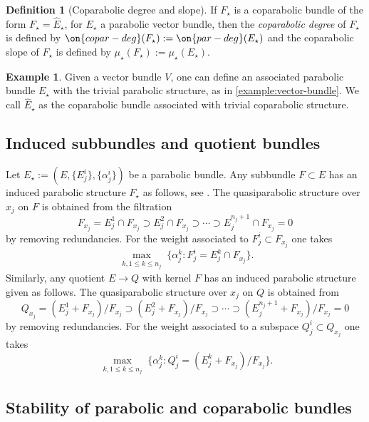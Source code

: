 \documentclass[12 pt]{amsart}
\theoremstyle{plain}
\theoremstyle{definition}
\newtheorem{definition}[subsubsection]{Definition}
\newtheorem{example}[subsubsection]{Example}
\theoremstyle{remark}
\numberwithin{equation}{section}
\begin{document}
\begin{definition}[Coparabolic degree and slope]
	\label{definition:}
	If $F_\star$ is a coparabolic bundle of the form $F_\star = \widehat{E}_\star$,
for $E_\star$ a parabolic vector bundle, then the {\em coparabolic degree} of
$F_\star$ is defined by $\on{copar-deg}(F_\star) := \on{par-deg}(E_\star)$ and the
coparabolic slope of $F_\star$ is defined by $\mu_\star(F_\star) := \mu_\star(E_\star)$.
\end{definition}
\begin{example}
	\label{example:vector-bundle-co}
	Given a vector bundle $V$, one can define an associated parabolic bundle
	$E_\star$ with the trivial parabolic structure, as in
	\autoref{example:vector-bundle}. We call $\widehat{E}_\star$
	as the coparabolic bundle associated with trivial coparabolic structure.
\end{example}



\subsection{Induced subbundles and quotient bundles}

\label{subsubsection:induced-subbundle}
Let $E_\star := (E, \{E^i_j\}, \{\alpha^i_j\})$ be a parabolic bundle.
	Any subbundle $F \subset E$ has an induced parabolic structure $F_\star$ as
	follows, see
\cite[Part 3, \S1.A, Definition 4]{seshadri:fibres-vectoriels-sur-les-courbes-algebriques}.
	The quasiparabolic structure over $x_j$ on $F$ is obtained
	from the filtration $$F_{x_j} = E^1_j \cap F_{x_j} \supset E^2_j \cap
	F_{x_j} \supset \cdots \supset E^{n_j+1}_j \cap F_{x_j} = 0$$
	by removing redundancies. For the weight associated to $F^i_j \subset
	F_{x_j}$ one takes $$\max_{\substack{k, 1 \leq k \leq n_j}} \{ \alpha^k_j : F^i_j = E^k_j \cap
	F_{x_j}\}.$$
	Similarly, any quotient $E \to Q$ with kernel $F$ has an induced parabolic structure
	given as follows.
	The quasiparabolic structure over $x_j$ on $Q$ is obtained from
	$$Q_{x_j} = (E^1_j+F_{x_j})/F_{x_j} \supset (E^2_j+F_{x_j})/F_{x_j}\supset\cdots\supset 
	(E^{n_j+1}_j+F_{x_j})/F_{x_j} = 0$$
	by removing redundancies. For the weight associated to a subspace $Q^i_j \subset
Q_{x_j}$ one takes $$\max_{\substack{k, 1 \leq k \leq n_j}} \{ \alpha^k_j : Q^i_j = (E^k_j + F_{x_j})
/F_{x_j}\}.$$

\subsection{Stability of parabolic and coparabolic bundles}
\label{subsubsection:stability-parabolic}
\end{document}
